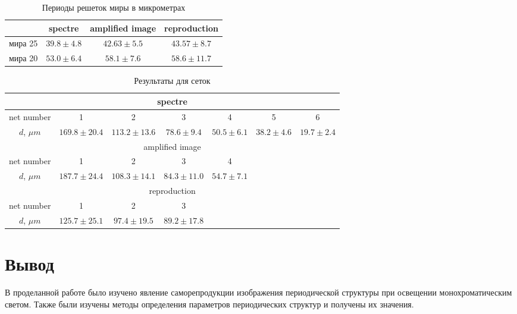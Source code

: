 \documentclass[a4paper, 12pt]{article}
\begin{document}
	\begin{table}[h!]\label{tab:mira_res}
		\centering
		\caption{Периоды решеток миры в микрометрах}
		\begin{tabular}{|c|c|c|c|}
			\hline
			& spectre      & amplified image & reproduction  \\ \hline
			мира 25 & $39.8\pm4.8$ & $42.63\pm5.5$   & $43.57\pm8.7$ \\ \hline
			мира 20 & $53.0\pm6.4$ & $58.1\pm7.6$    & $58.6\pm11.7$ \\ \hline
		\end{tabular}
	\end{table}
	
	\vspace{4\baselineskip}
	
	\begin{table}[h!]\label{tab:net_res}
		\centering
		\caption{Результаты для сеток}
		\begin{tabular}{|c|c|c|c|c|l|c|}
			\hline
			\multicolumn{7}{|c|}{spectre}                                                                                                    \\ \hline
			net number   & 1              & 2              & 3             & 4            & \multicolumn{1}{c|}{5}            & 6            \\ \hline
			$d$, $\mu m$ & $169.8\pm20.4$ & $113.2\pm13.6$ & $78.6\pm9.4$  & $50.5\pm6.1$ & \multicolumn{1}{c|}{$38.2\pm4.6$} & $19.7\pm2.4$ \\ \hline
			\multicolumn{7}{|c|}{amplified image}                                                                                            \\ \hline
			net number   & 1              & 2              & 3             & 4            & \multicolumn{2}{l|}{\multirow{2}{*}{}}           \\ \cline{1-5}
			$d$, $\mu m$ & $187.7\pm24.4$ & $108.3\pm14.1$ & $84.3\pm11.0$ & $54.7\pm7.1$ & \multicolumn{2}{l|}{}                            \\ \hline
			\multicolumn{7}{|c|}{reproduction}                                                                                               \\ \hline
			net number   & 1              & 2              & 3             & \multicolumn{3}{c|}{\multirow{2}{*}{}}                          \\ \cline{1-4}
			$d$, $\mu m$ & $125.7\pm25.1$ & $97.4\pm19.5$  & $89.2\pm17.8$ & \multicolumn{3}{c|}{}                                           \\ \hline
		\end{tabular}
	\end{table}
	
	\section{Вывод}
	
	В проделанной работе было изучено явление саморепродукции изображения периодической структуры при освещении монохроматическим светом. Также были изучены методы определения параметров периодических структур и получены их значения.
	
	
\end{document}
